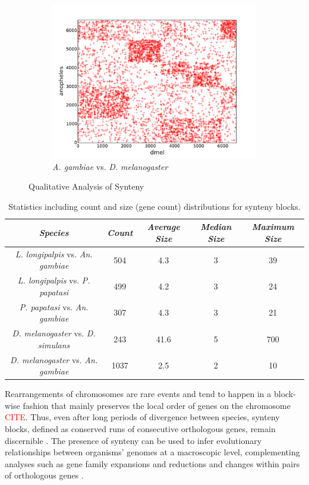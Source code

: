 \begin{figure}[H]
\begin{subfigure}[b]{0.45\textwidth}
    \includegraphics[width=\textwidth]{figures/synteny/dmel_anopheles_plot}
    \caption{\emph{A. gambiae} vs. \emph{D. melanogaster}}
    \label{fig:synteny-dotplots-anopheles-drosophila}
  \end{subfigure}
\label{fig:dot-plots}
\caption{Qualitative Analysis of Synteny}
\end{figure}

\begin{table}[H]
  \centering
  \begin{tabular}{c c c c c} \hline
    \emph{Species} & \emph{Count} & \emph{Average Size} & \emph{Median Size} & \emph{Maximum Size} \\ \hline
    \emph{L. longipalpis} vs. \emph{An. gambiae} & 504 & 4.3 & 3 & 39 \\
    \emph{L. longipalpis} vs. \emph{P. papatasi} & 499 & 4.2 & 3 & 24 \\
    \emph{P. papatasi} vs. \emph{An. gambiae} & 307 & 4.3 & 3 & 21 \\
    \emph{D. melanogaster} vs. \emph{D. simulans} & 243 & 41.6 & 5 & 700 \\
    \emph{D. melanogaster} vs. \emph{An. gambiae} & 1037 & 2.5 & 2 & 10
  \end{tabular}
  \caption{Statistics including count and size (gene count) distributions for synteny blocks.}
  \label{tab:synteny-block-stats}
\end{table}

Rearrangements of chromosomes are rare events and tend to happen in a block-wise fashion that mainly preserves the local order of genes on the chromosome \textcolor{red}{CITE}. Thus, even after long periods of divergence between species, synteny blocks, defined as conserved runs of consecutive orthologous genes, remain discernible \cite{Heger2007}.  The presence of synteny can be used to infer evolutionary relationships between organisms' genomes at a macroscopic level, complementing analyses such as gene family expansions and reductions and changes within pairs of orthologous genes \cite{Zdobnov2002,Zdobnov2007}.


